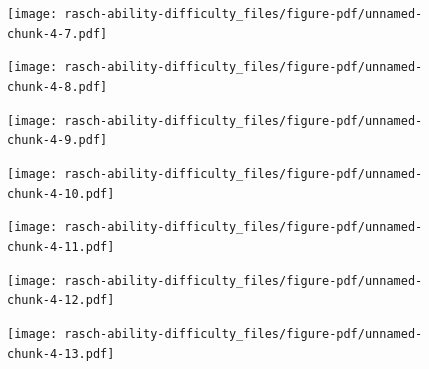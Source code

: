 \documentclass[
  letterpaper,
  DIV=11,
  numbers=noendperiod]{scrreprt}
\begin{document}
\begin{figure}[H]

{\centering \texttt{[image: rasch-ability-difficulty\_files/figure-pdf/unnamed-chunk-4-7.pdf]}

}

\end{figure}

\begin{figure}[H]

{\centering \texttt{[image: rasch-ability-difficulty\_files/figure-pdf/unnamed-chunk-4-8.pdf]}

}

\end{figure}

\begin{figure}[H]

{\centering \texttt{[image: rasch-ability-difficulty\_files/figure-pdf/unnamed-chunk-4-9.pdf]}

}

\end{figure}

\begin{figure}[H]

{\centering \texttt{[image: rasch-ability-difficulty\_files/figure-pdf/unnamed-chunk-4-10.pdf]}

}

\end{figure}

\begin{figure}[H]

{\centering \texttt{[image: rasch-ability-difficulty\_files/figure-pdf/unnamed-chunk-4-11.pdf]}

}

\end{figure}

\begin{figure}[H]

{\centering \texttt{[image: rasch-ability-difficulty\_files/figure-pdf/unnamed-chunk-4-12.pdf]}

}

\end{figure}

\begin{figure}[H]

{\centering \texttt{[image: rasch-ability-difficulty\_files/figure-pdf/unnamed-chunk-4-13.pdf]}

}

\end{figure}
\end{document}
